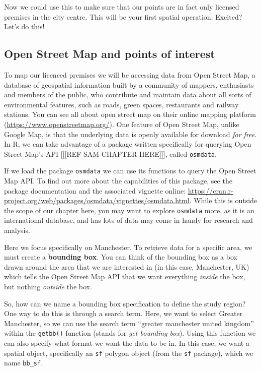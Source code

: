 \documentclass[
]{book}
\begin{document}
Now we could use this to make sure that our points are in fact only licensed premises in the city centre. This will be your first spatial operation. Excited? Let's do this!

\hypertarget{open-street-map-and-points-of-interest}{%
\subsection{Open Street Map and points of interest}\label{open-street-map-and-points-of-interest}}

To map our licenced premises we will be accessing data from Open Street Map, a database of geospatial information built by a community of mappers, enthusiasts and members of the public, who contribute and maintain data about all sorts of environmental features, such as roads, green spaces, restaurants and railway stations. You can see all about open street map on their online mapping platform (\url{https://www.openstreetmap.org/}). One feature of Open Street Map, unlike Google Map, is that the underlying data is openly available for download \emph{for free}. In R, we can take advantage of a package written specifically for querying Open Street Map's API {[}{[}{[}REF SAM CHAPTER HERE{]}{]}{]}, called \texttt{osmdata}.

If we load the package \texttt{osmdata} we can use its functions to query the Open Street Map API. To find out more about the capabilities of this package, see the package documentation and the associated vignette online: \url{https://cran.r-project.org/web/packages/osmdata/vignettes/osmdata.html}. While this is outside the scope of our chapter here, you may want to explore \texttt{osmdata} more, as it is an international database, and has lots of data may come in handy for research and analysis.

Here we focus specifically on Manchester. To retrieve data for a specific area, we must create a \textbf{bounding box}. You can think of the bounding box as a box drawn around the area that we are interested in (in this case, Manchester, UK) which tells the Open Street Map API that we want everything \emph{inside} the box, but nothing \emph{outside} the box.

So, how can we name a bounding box specification to define the study region? One way to do this is through a search term. Here, we want to select Greater Manchester, so we can use the search term ``greater manchester united kingdom'' within the \texttt{getbb()} function (stands for \emph{get bounding box}). Using this function we can also specify what format we want the data to be in. In this case, we want a spatial object, specifically an \texttt{sf} polygon object (from the \texttt{sf} package), which we name \texttt{bb\_sf}.
\end{document}
